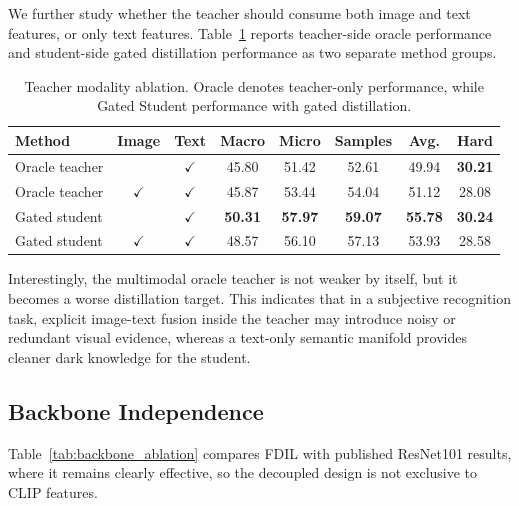 We further study whether the teacher should consume both image and text features, or only text features. Table~\ref{tab:teacher_modality_ablation} reports teacher-side oracle performance and student-side gated distillation performance as two separate method groups.
\begin{table}[htbp]
\centering
\caption{Teacher modality ablation. Oracle denotes teacher-only performance, while Gated Student performance with gated distillation.}
\label{tab:teacher_modality_ablation}
\begin{tabular}{lccccccc}
\hline
Method & Image & Text & Macro & Micro & Samples & Avg. & Hard \\
\hline
Oracle teacher &  & $\checkmark$ & 45.80 & 51.42 & 52.61 & 49.94 & \textbf{30.21} \\
Oracle teacher & $\checkmark$ & $\checkmark$ & 45.87 & 53.44 & 54.04 & 51.12 & 28.08 \\
\hline
Gated student &  & $\checkmark$ & \textbf{50.31} & \textbf{57.97} & \textbf{59.07} & \textbf{55.78} & \textbf{30.24} \\
Gated student & $\checkmark$ & $\checkmark$ & 48.57 & 56.10 & 57.13 & 53.93 & 28.58 \\
\hline
\end{tabular}
\end{table}

Interestingly, the multimodal oracle teacher is not weaker by itself, but it becomes a worse distillation target. This indicates that in a subjective recognition task, explicit image-text fusion inside the teacher may introduce noisy or redundant visual evidence, whereas a text-only semantic manifold provides cleaner dark knowledge for the student.
\fi

\subsection{Backbone Independence}

Table~\ref{tab:backbone_ablation} compares FDIL with published ResNet101 results, where it remains clearly effective, so the decoupled design is not exclusive to CLIP features.  

